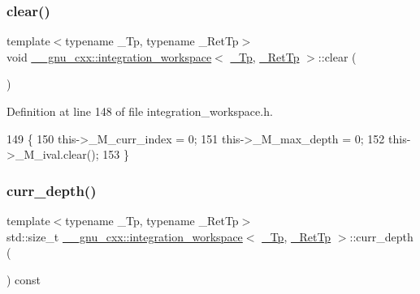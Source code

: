 \subsubsection{\texorpdfstring{clear()}{clear()}}
{\footnotesize\ttfamily template$<$typename \+\_\+\+Tp, typename \+\_\+\+Ret\+Tp$>$ \\
void \hyperlink{class____gnu__cxx_1_1integration__workspace}{\+\_\+\+\_\+gnu\+\_\+cxx\+::integration\+\_\+workspace}$<$ \hyperlink{namespace____gnu__cxx_a3b19a9c800ca194374ef9172290f7d79}{\+\_\+\+Tp}, \hyperlink{namespace____gnu__cxx_a886e03ece3d53ff7fa6c098a40f93fa5}{\+\_\+\+Ret\+Tp} $>$\+::clear (\begin{DoxyParamCaption}{ }\end{DoxyParamCaption})\hspace{0.3cm}{\ttfamily [inline]}}



Definition at line 148 of file integration\+\_\+workspace.\+h.


\begin{DoxyCode}
149       \{
150         this->\_M\_curr\_index = 0;
151         this->\_M\_max\_depth = 0;
152         this->\_M\_ival.clear();
153       \}
\end{DoxyCode}
\mbox{\label{class____gnu__cxx_1_1integration__workspace_ad60321be84f0301856bf20f31ece47de}} 
\subsubsection{\texorpdfstring{curr\+\_\+depth()}{curr\_depth()}}
{\footnotesize\ttfamily template$<$typename \+\_\+\+Tp, typename \+\_\+\+Ret\+Tp$>$ \\
std\+::size\+\_\+t \hyperlink{class____gnu__cxx_1_1integration__workspace}{\+\_\+\+\_\+gnu\+\_\+cxx\+::integration\+\_\+workspace}$<$ \hyperlink{namespace____gnu__cxx_a3b19a9c800ca194374ef9172290f7d79}{\+\_\+\+Tp}, \hyperlink{namespace____gnu__cxx_a886e03ece3d53ff7fa6c098a40f93fa5}{\+\_\+\+Ret\+Tp} $>$\+::curr\+\_\+depth (\begin{DoxyParamCaption}{ }\end{DoxyParamCaption}) const\hspace{0.3cm}{\ttfamily [inline]}}

